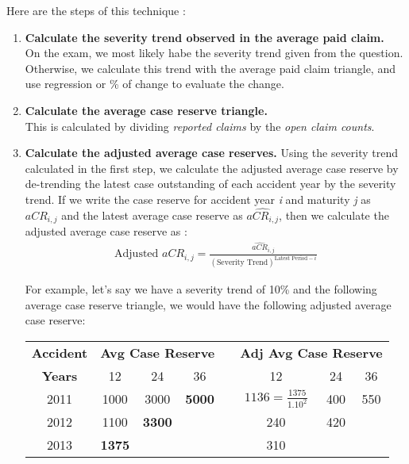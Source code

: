 \documentclass[11pt, english]{memoir}
\numberwithin{definition}{section}
\begin{document}
	Here are the steps of this technique :
	\begin{enumerate}
		\item \textbf{Calculate the severity trend observed in the average paid claim.}\\
		On the exam, we most likely habe the severity trend given from the question. Otherwise, we calculate this trend with the average paid claim triangle, and use regression or \% of change to evaluate the change.\\
		
		\item \textbf{Calculate the average case reserve triangle.}\\
		This is calculated by dividing \emph{reported claims} by the \emph{open claim counts}.\\
		
		\item \textbf{Calculate the adjusted average case reserves.} 
		Using the severity trend calculated in the first step, we calculate the adjusted average case reserve by de-trending the latest case outstanding of each accident year by the severity trend. If we write the case reserve for accident year \emph{i} and maturity \emph{j} as $ aCR_{i,j} $ and the latest average case reserve as $ \hat{aCR_{i,j}} $, then we calculate the adjusted average case reserve as : 
		\begin{align*}
		\text{Adjusted } aCR_{i,j} = \frac{\hat{aCR}_{i,j}}{(\text{Severity Trend})^{\text{Latest Period} - i}}
		\end{align*}
		
		For example, let's say we have a severity trend of 10\% and the following average case reserve triangle, we would have the following adjusted average case reserve:\\
		
		\begin{tabularx}{0.9\textwidth}{cccclccc}
			\toprule
			\textbf{Accident} & \multicolumn{3}{c}{\textbf{Avg Case Reserve}} & & \multicolumn{3}{c}{\textbf{Adj Avg Case Reserve}}\\
			\textbf{Years} & 12 & 24 & 36 & & 12 & 24 & 36  \\
			\midrule
			2011 & 1000 & 3000 & \textbf{5000} & & $ 1136 = \frac{1375}{1.10^{2}} $ & 400 & 550 \\
			2012 & 1100 & \textbf{3300} & & & 240 & 420 & \\
			2013 & \textbf{1375} & &  & & 310 & & \\
			\bottomrule
		\end{tabularx}\\
		
	\end{enumerate}
	
\end{document}
